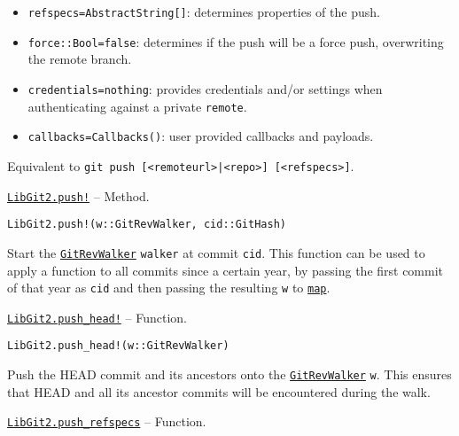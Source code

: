 \begin{adjustwidth}{2em}{0pt}
\begin{itemize}
\item \texttt{refspecs=AbstractString[]}: determines properties of the push.


\item \texttt{force::Bool=false}: determines if the push will be a force push,  overwriting the remote branch.


\item \texttt{credentials=nothing}: provides credentials and/or settings when authenticating against  a private \texttt{remote}.


\item \texttt{callbacks=Callbacks()}: user provided callbacks and payloads.

\end{itemize}
Equivalent to \texttt{git push [<remoteurl>|<repo>] [<refspecs>]}.



\end{adjustwidth}
\hypertarget{4123635192013611702}{}
\hyperlink{4123635192013611702}{\texttt{LibGit2.push!}}  -- {Method.}

\begin{adjustwidth}{2em}{0pt}


\begin{verbatim}
LibGit2.push!(w::GitRevWalker, cid::GitHash)
\end{verbatim}

Start the \hyperlink{7800294839307043628}{\texttt{GitRevWalker}} \texttt{walker} at commit \texttt{cid}. This function can be used to apply a function to all commits since a certain year, by passing the first commit of that year as \texttt{cid} and then passing the resulting \texttt{w} to \hyperlink{546421066875217314}{\texttt{map}}.



\end{adjustwidth}
\hypertarget{9792433728015067335}{}
\hyperlink{9792433728015067335}{\texttt{LibGit2.push\_head!}}  -- {Function.}

\begin{adjustwidth}{2em}{0pt}


\begin{verbatim}
LibGit2.push_head!(w::GitRevWalker)
\end{verbatim}

Push the HEAD commit and its ancestors onto the \hyperlink{7800294839307043628}{\texttt{GitRevWalker}} \texttt{w}. This ensures that HEAD and all its ancestor commits will be encountered during the walk.



\end{adjustwidth}
\hypertarget{13692255696673908343}{}
\hyperlink{13692255696673908343}{\texttt{LibGit2.push\_refspecs}}  -- {Function.}

